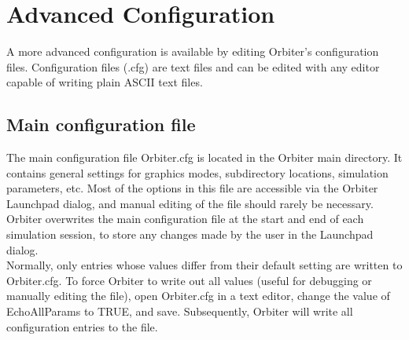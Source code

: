 \documentclass[Orbiter User Manual.tex]{subfiles}
\begin{document}
\section{Advanced Configuration}
A more advanced configuration is available by editing Orbiter's configuration files. Configuration files (.cfg) are text files and can be edited with any editor capable of writing plain ASCII text files.


\subsection{Main configuration file}
The main configuration file Orbiter.cfg is located in the Orbiter main directory. It contains general settings for graphics modes, subdirectory locations, simulation parameters, etc. Most of the options in this file are accessible via the Orbiter Launchpad dialog, and manual editing of the file should rarely be necessary.\\
Orbiter overwrites the main configuration file at the start and end of each simulation session, to store any changes made by the user in the Launchpad dialog.\\
Normally, only entries whose values differ from their default setting are written to Orbiter.cfg. To force Orbiter to write out all values (useful for debugging or manually editing the file), open Orbiter.cfg in a text editor, change the value of EchoAllParams to TRUE, and save. Subsequently, Orbiter will write all configuration entries to the file.
\end{document}
